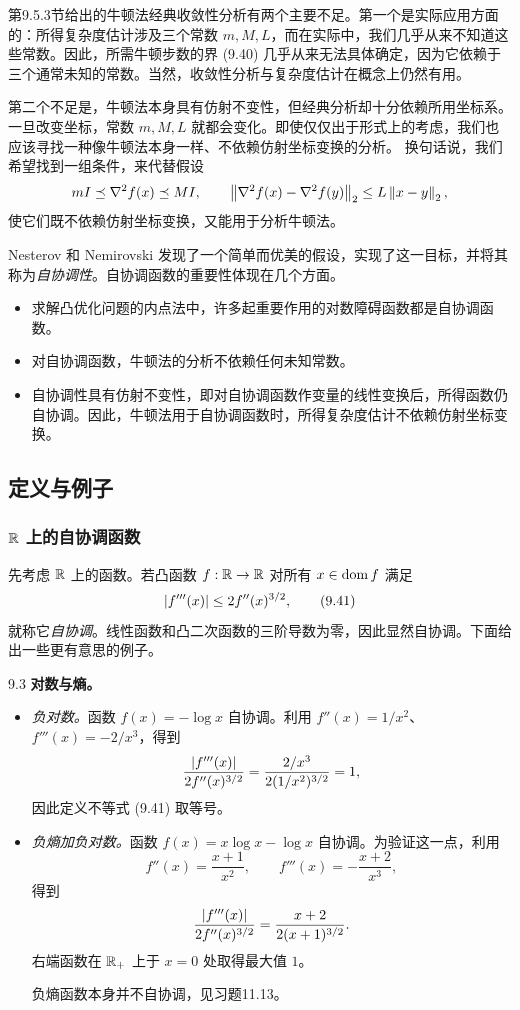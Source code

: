 第9.5.3节给出的牛顿法经典收敛性分析有两个主要不足。第一个是实际应用方面的：所得复杂度估计涉及三个常数 $m,M,L$，而在实际中，我们几乎从来不知道这些常数。因此，所需牛顿步数的界 (9.40) 几乎从来无法具体确定，因为它依赖于三个通常未知的常数。当然，收敛性分析与复杂度估计在概念上仍然有用。

第二个不足是，牛顿法本身具有仿射不变性，但经典分析却十分依赖所用坐标系。一旦改变坐标，常数 $m,M,L$ 就都会变化。即使仅仅出于形式上的考虑，我们也应该寻找一种像牛顿法本身一样、不依赖仿射坐标变换的分析。
换句话说，我们希望找到一组条件，来代替假设
\[
 mI\preceq\nabla^2f(x)\preceq MI,\qquad
 \left\lVert \nabla^2f(x)-\nabla^2f(y)\right\rVert_2\le L\left\lVert x-y\right\rVert_2,
\]
使它们既不依赖仿射坐标变换，又能用于分析牛顿法。

Nesterov 和 Nemirovski 发现了一个简单而优美的假设，实现了这一目标，并将其称为\emph{自协调性}。自协调函数的重要性体现在几个方面。
\begin{itemize}
\item 求解凸优化问题的内点法中，许多起重要作用的对数障碍函数都是自协调函数。
\item 对自协调函数，牛顿法的分析不依赖任何未知常数。
\item 自协调性具有仿射不变性，即对自协调函数作变量的线性变换后，所得函数仍自协调。因此，牛顿法用于自协调函数时，所得复杂度估计不依赖仿射坐标变换。
\end{itemize}

\subsection{定义与例子}
\subsubsection*{$\mathbb R$ 上的自协调函数}
先考虑 $\mathbb R$ 上的函数。若凸函数 $f:\mathbb R\to\mathbb R$ 对所有 $x\in\operatorname{dom} f$ 满足
\begin{equation}
 \left\lvert f'''(x)\right\rvert\le2f''(x)^{3/2},\tag{9.41}
\end{equation}
就称它\emph{自协调}。线性函数和凸二次函数的三阶导数为零，因此显然自协调。下面给出一些更有意思的例子。

\begin{origexample}{9.3}
\textbf{对数与熵。}
\begin{itemize}
\item \emph{负对数。}函数 $f(x)=-\log x$ 自协调。利用 $f''(x)=1/x^2$、$f'''(x)=-2/x^3$，得到
\[
 \frac{\left\lvert f'''(x)\right\rvert}{2f''(x)^{3/2}}
 =\frac{2/x^3}{2(1/x^2)^{3/2}}=1,
\]
因此定义不等式 (9.41) 取等号。
\item \emph{负熵加负对数。}函数 $f(x)=x\log x-\log x$ 自协调。为验证这一点，利用
\[
 f''(x)=\frac{x+1}{x^2},\qquad f'''(x)=-\frac{x+2}{x^3},
\]
得到
\[
 \frac{\left\lvert f'''(x)\right\rvert}{2f''(x)^{3/2}}
 =\frac{x+2}{2(x+1)^{3/2}}.
\]
右端函数在 $\mathbb R_+$ 上于 $x=0$ 处取得最大值 $1$。

负熵函数本身并不自协调，见习题11.13。
\end{itemize}
\end{origexample}

